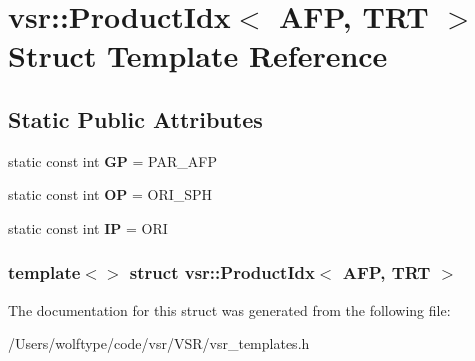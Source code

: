 \hypertarget{structvsr_1_1_product_idx_3_01_a_f_p_00_01_t_r_t_01_4}{\section{vsr\-:\-:Product\-Idx$<$ A\-F\-P, T\-R\-T $>$ Struct Template Reference}
\label{structvsr_1_1_product_idx_3_01_a_f_p_00_01_t_r_t_01_4}
}
\subsection*{Static Public Attributes}
\begin{DoxyCompactItemize}
\item 
\hypertarget{structvsr_1_1_product_idx_3_01_a_f_p_00_01_t_r_t_01_4_aad426218f70a3f449b0a6d0ed0d9b793}{static const int {\bfseries G\-P} = P\-A\-R\-\_\-\-A\-F\-P}\label{structvsr_1_1_product_idx_3_01_a_f_p_00_01_t_r_t_01_4_aad426218f70a3f449b0a6d0ed0d9b793}

\item 
\hypertarget{structvsr_1_1_product_idx_3_01_a_f_p_00_01_t_r_t_01_4_a95ab1537c84bb84befd479ae2db4d521}{static const int {\bfseries O\-P} = O\-R\-I\-\_\-\-S\-P\-H}\label{structvsr_1_1_product_idx_3_01_a_f_p_00_01_t_r_t_01_4_a95ab1537c84bb84befd479ae2db4d521}

\item 
\hypertarget{structvsr_1_1_product_idx_3_01_a_f_p_00_01_t_r_t_01_4_ac0fcf75ac1708c00394c1aec4e6d2c20}{static const int {\bfseries I\-P} = O\-R\-I}\label{structvsr_1_1_product_idx_3_01_a_f_p_00_01_t_r_t_01_4_ac0fcf75ac1708c00394c1aec4e6d2c20}

\end{DoxyCompactItemize}
\subsubsection*{template$<$$>$ struct vsr\-::\-Product\-Idx$<$ A\-F\-P, T\-R\-T $>$}



The documentation for this struct was generated from the following file\-:\begin{DoxyCompactItemize}
\item 
/\-Users/wolftype/code/vsr/\-V\-S\-R/vsr\-\_\-templates.\-h\end{DoxyCompactItemize}
